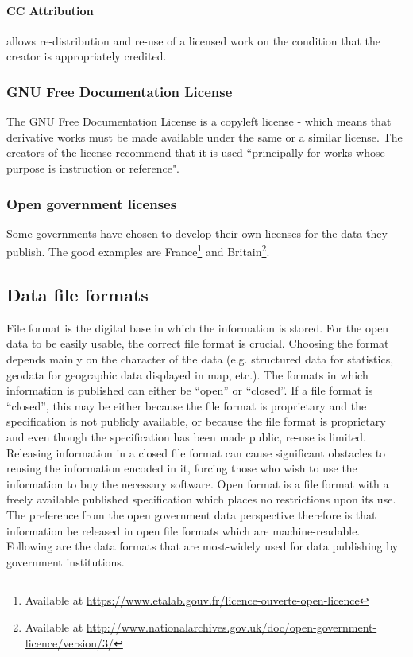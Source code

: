 \documentclass[thesis=B,english]{FITthesis}[2012/06/26]
\begin{document}
	\paragraph{CC Attribution}
	allows re-distribution and re-use of a licensed work on the condition that the creator is appropriately credited.
	\subsubsection{GNU Free Documentation License}
	The GNU Free Documentation License is a copyleft license - which means that derivative works must be made available under the same or a similar license. The creators of the license recommend that it is used “principally for works whose purpose is instruction or reference".
	\subsubsection{Open government licenses}
	\label{opengovernmentlicense}
	Some governments have chosen to develop their own licenses for the data they publish. The good examples are France\footnote{Available at \url{https://www.etalab.gouv.fr/licence-ouverte-open-licence}} and Britain\footnote{Available at \url{http://www.nationalarchives.gov.uk/doc/open-government-licence/version/3/}}.
	\subsection{Data file formats}
	\label{fileformats}
	 File format is the digital base in which the information is stored. For the open data to be easily usable, the correct file format is crucial. Choosing the format depends mainly on the character of the data (e.g. structured data for statistics, geodata for geographic data displayed in map, etc.). The formats in which information is published can either be “open” or “closed”. If a file format is “closed”, this may be either because the file format is proprietary and the specification is not publicly available, or because the file format is proprietary and even though the specification has been made public, re-use is limited. Releasing information in a closed file format can cause significant obstacles to reusing the information encoded in it, forcing those who wish to use the information to buy the necessary software. Open format is a file format with a freely available published specification which places no restrictions upon its use. The preference from the open government data perspective therefore is that information be released in open file formats which are machine-readable. Following are the data formats that are most-widely used for data publishing by government institutions.\cite{opendatahandbookfileformats}
	 
\end{document}
